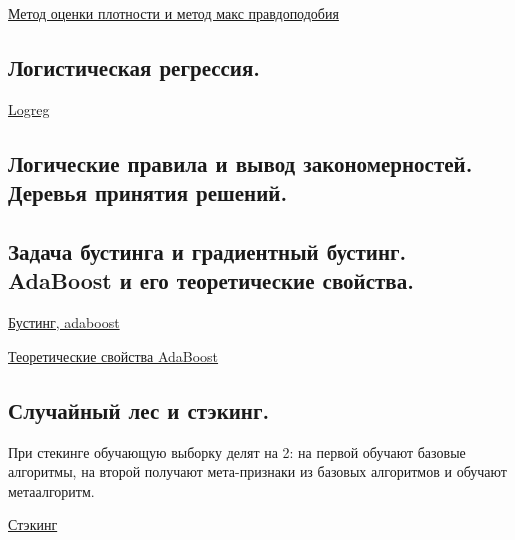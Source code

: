 \documentclass{article}
\begin{document}
\href{
	http://www.machinelearning.ru/wiki/index.php?title=%
}{
	Метод оценки плотности и метод макс правдоподобия
}

\subsection{Логистическая регрессия.}

\href{http://www.machinelearning.ru/wiki/index.php?title=%D0%9B%D0%BE%D0%B3%D0%B8%D1%81%D1%82%D0%B8%D1%87%D0%B5%D1%81%D0%BA%D0%B0%D1%8F_%D1%80%D0%B5%D0%B3%D1%80%D0%B5%D1%81%D1%81%D0%B8%D1%8F}{
	Logreg
}


\subsection{Логические правила и вывод закономерностей. Деревья принятия решений.}


\subsection{Задача бустинга и градиентный бустинг. AdaBoost и его теоретические свойства.}

\href{
	https://neerc.ifmo.ru/wiki/index.php?title=%
}{
	Бустинг, adaboost
}

\href{
	https://logic.pdmi.ras.ru/~sergey/teaching/mlstc12/16-boosting.pdf
}{
	Теоретические свойства AdaBoost
}


\subsection{Случайный лес и стэкинг.}


При стекинге обучающую выборку делят на 2: на первой обучают базовые алгоритмы,
на второй получают мета-признаки из базовых алгоритмов и обучают метаалгоритм.

\href{
	https://learnmachinelearning.fandom.com/ru/wiki/%
}{Стэкинг}
\end{document}
